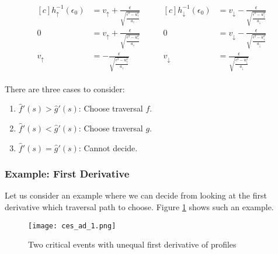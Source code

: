 \begin{align*}
	\begin{aligned}[c]
		h_{\uparrow}^{-1}(\epsilon_0) &= v_{\uparrow} + \frac{ \epsilon }{ \sqrt{\frac{\epsilon^2 - u_{\uparrow}^2}{a_{\uparrow}}}}\\
		0 &= v_{\uparrow} + \frac{ \epsilon }{ \sqrt{\frac{\epsilon^2 - u_{\uparrow}^2}{a_{\uparrow}}}}\\
		v_{\uparrow} &= - \frac{ \epsilon }{ \sqrt{\frac{\epsilon^2 - u_{\uparrow}^2}{a_{\uparrow}}}}
	\end{aligned}
	\qquad
	\begin{aligned}[c]
		h_{\downarrow}^{-1}(\epsilon_0) &= v_{\downarrow} - \frac{ \epsilon }{ \sqrt{\frac{\epsilon^2 - u_{\downarrow}^2}{a_{\downarrow}}}}\\
		0 &= v_{\downarrow} - \frac{ \epsilon }{ \sqrt{\frac{\epsilon^2 - u_{\downarrow}^2}{a_{\downarrow}}}}\\
		v_{\downarrow} &= \frac{ \epsilon }{ \sqrt{\frac{\epsilon^2 - u_{\downarrow}^2}{a_{\downarrow}}}}
	\end{aligned}
\end{align*}
	

There are three cases to consider:

\begin{enumerate}
	\item $\hat{f}'(s) > \hat{g}'(s)$: Choose traversal $f$.
	\item $\hat{f}'(s) < \hat{g}'(s)$: Choose traversal $g$.
	\item $\hat{f}'(s) = \hat{g}'(s)$: Cannot decide.
\end{enumerate}

\subsubsection{Example: First Derivative}

Let us consider an example where we can decide from looking at the first derivative which traversal path to choose. Figure \ref{fig:ces_ad_1} shows such an example.

 \begin{figure}[H]
    \centering
    
    \texttt{[image: ces\_ad\_1.png]}
		
	\caption{Two critical events with unequal first derivative of profiles\protect\footnotemark}
    \label{fig:ces_ad_1}
\end{figure}

